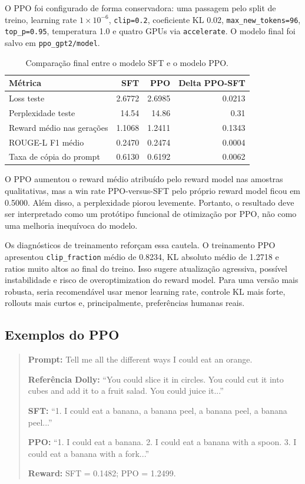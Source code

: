 \documentclass[a4paper,12pt]{article}
\begin{document}
O PPO foi configurado de forma conservadora: uma passagem pelo split de treino, learning rate $1 \times 10^{-6}$, \texttt{clip=0.2}, coeficiente KL 0.02, \texttt{max\_new\_tokens=96}, \texttt{top\_p=0.95}, temperatura 1.0 e quatro GPUs via \texttt{accelerate}. O modelo final foi salvo em \texttt{ppo\_gpt2/model}.

\begin{table}[h]
\centering
\begin{tabular}{|l|r|r|r|}
\hline
\textbf{Métrica} & \textbf{SFT} & \textbf{PPO} & \textbf{Delta PPO-SFT} \\
\hline
Loss teste & 2.6772 & 2.6985 & 0.0213 \\
Perplexidade teste & 14.54 & 14.86 & 0.31 \\
Reward médio nas gerações & 1.1068 & 1.2411 & 0.1343 \\
ROUGE-L F1 médio & 0.2470 & 0.2474 & 0.0004 \\
Taxa de cópia do prompt & 0.6130 & 0.6192 & 0.0062 \\
\hline
\end{tabular}
\caption{Comparação final entre o modelo SFT e o modelo PPO.}
\end{table}

O PPO aumentou o reward médio atribuído pelo reward model nas amostras qualitativas, mas a win rate PPO-versus-SFT pelo próprio reward model ficou em 0.5000. Além disso, a perplexidade piorou levemente. Portanto, o resultado deve ser interpretado como um protótipo funcional de otimização por PPO, não como uma melhoria inequívoca do modelo.

Os diagnósticos de treinamento reforçam essa cautela. O treinamento PPO apresentou \texttt{clip\_fraction} médio de 0.8234, KL absoluto médio de 1.2718 e ratios muito altos ao final do treino. Isso sugere atualização agressiva, possível instabilidade e risco de overoptimization do reward model. Para uma versão mais robusta, seria recomendável usar menor learning rate, controle KL mais forte, rollouts mais curtos e, principalmente, preferências humanas reais.

\subsection*{Exemplos do PPO}

\begin{quote}
\small
\textbf{Prompt:} Tell me all the different ways I could eat an orange.

\textbf{Referência Dolly:} ``You could slice it in circles. You could cut it into cubes and add it to a fruit salad. You could juice it...''

\textbf{SFT:} ``1. I could eat a banana, a banana peel, a banana peel, a banana peel...''

\textbf{PPO:} ``1. I could eat a banana. 2. I could eat a banana with a spoon. 3. I could eat a banana with a fork...''

\textbf{Reward:} SFT = 0.1482; PPO = 1.2499.
\end{quote}
\end{document}
